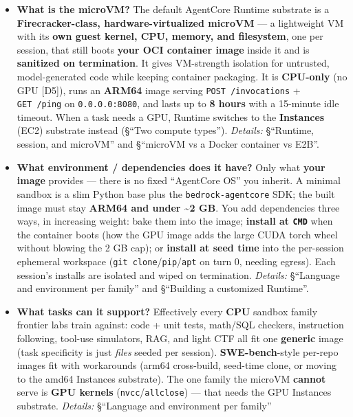 \documentclass[
  paper=a4,
  ,captions=tableheading
]{scrartcl}
\providecommand{\tightlist}{%
  \setlength{\itemsep}{0pt}\setlength{\parskip}{0pt}}
\begin{document}
\begin{itemize}
\tightlist
\item
  \textbf{What is the microVM?} The default AgentCore Runtime substrate
  is a \textbf{Firecracker-class, hardware-virtualized microVM} --- a
  lightweight VM with its \textbf{own guest kernel, CPU, memory, and
  filesystem}, one per session, that still boots \textbf{your OCI
  container image} inside it and is \textbf{sanitized on termination}.
  It gives VM-strength isolation for untrusted, model-generated code
  while keeping container packaging. It is \textbf{CPU-only} (no GPU
  {[}D5{]}), runs an \textbf{ARM64} image serving
  \texttt{POST\ /invocations} + \texttt{GET\ /ping} on
  \texttt{0.0.0.0:8080}, and lasts up to \textbf{8 hours} with a
  15-minute idle timeout. When a task needs a GPU, Runtime switches to
  the \textbf{Instances} (EC2) substrate instead (§``Two compute
  types''). \emph{Details:} §``Runtime, session, and microVM'' and
  §``microVM vs a Docker container vs E2B''.
\item
  \textbf{What environment / dependencies does it have?} Only what
  \textbf{your image} provides --- there is no fixed ``AgentCore OS''
  you inherit. A minimal sandbox is a slim Python base plus the
  \texttt{bedrock-agentcore} SDK; the built image must stay
  \textbf{ARM64 and under \textasciitilde2 GB}. You add dependencies
  three ways, in increasing weight: bake them into the image;
  \textbf{install at \texttt{CMD}} when the container boots (how the GPU
  image adds the large CUDA torch wheel without blowing the 2 GB cap);
  or \textbf{install at seed time} into the per-session ephemeral
  workspace (\texttt{git\ clone}/\texttt{pip}/\texttt{apt} on turn 0,
  needing egress). Each session's installs are isolated and wiped on
  termination. \emph{Details:} §``Language and environment per family''
  and §``Building a customized Runtime''.
\item
  \textbf{What tasks can it support?} Effectively every \textbf{CPU}
  sandbox family frontier labs train against: code + unit tests,
  math/SQL checkers, instruction following, tool-use simulators, RAG,
  and light CTF all fit one \textbf{generic} image (task specificity is
  just \emph{files} seeded per session). \textbf{SWE-bench}-style
  per-repo images fit with workarounds (arm64 cross-build, seed-time
  clone, or moving to the amd64 Instances substrate). The one family the
  microVM \textbf{cannot} serve is \textbf{GPU kernels}
  (\texttt{nvcc}/\texttt{allclose}) --- that needs the GPU Instances
  substrate. \emph{Details:} §``Language and environment per family''

\end{itemize}
\end{document}
